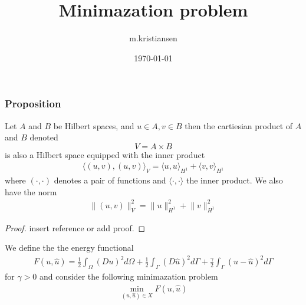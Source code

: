 \documentclass[11pt, norsk, a4paper]{article}
\title{Minimazation problem}
\author{m.kristiansen}
\date{\today}
\newcommand\norm[1]{\lVert#1\rVert}
\newcommand\inner[1]{\langle#1\rangle}
\begin{document}
\maketitle

\subsubsection*{Proposition}
Let $A$ and $B$ be Hilbert spaces, and $u \in A, v\in B$ then the cartiesian product of $A$ and $B$ denoted 
$$V = A\times B$$
is also a Hilbert space equipped with the inner product 
\begin{align*}
    \inner{(u,v), (u,v)}_V = \inner{u,u}_{H^1}+\inner{v,v}_{H^1}
\end{align*}
where $(\cdot, \cdot)$ denotes a pair of functions and $\inner{\cdot, \cdot}$ the inner product. We also have the norm
\begin{align*}
    \norm{(u,v)}^2_V = \norm{u}^2_{H^1}+\norm{v}^2_{H^1}
\end{align*}
\begin{proof}
    insert reference or add proof.
\end{proof}


We define the the energy functional 
\begin{align*}
    F(u,\hat{u}) = \frac{1}{2}\int_\Omega (Du)^2 d\Omega + \frac{1}{2}\int_{\Gamma}(D\hat{u})^2 d\Gamma + \frac{\gamma}{2}\int_{\Gamma} (u-\hat{u})^2 d\Gamma
\end{align*}
for $\gamma > 0$ and consider the following minimazation problem 
\begin{align*}
    \min_{(u,\hat{u}) \in X} F(u,\hat{u})
\end{align*}
\end{document}
